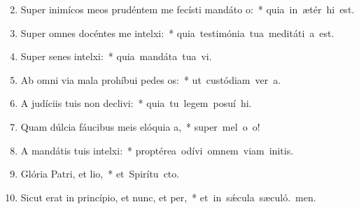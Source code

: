 \begin{flushleft}
\begin{enumerate}[leftmargin=*]
\setcounter{enumi}{1}

\item Super inimícos meos prudéntem me fecísti mandáto o:~* \mbox{quia in ætér hi est.}
\item Super omnes docéntes me intelxi:~* \mbox{quia testimónia tua meditáti a est.}
\item Super senes intelxi:~* \mbox{quia mandáta tua vi.}
\item Ab omni via mala prohíbui pedes os:~* \mbox{ut custódiam ver a.}
\item A judíciis tuis non declivi:~* \mbox{quia tu legem posuí hi.}
\item Quam dúlcia fáucibus meis elóquia a,~* \mbox{super mel o o!}
\item A mandátis tuis intelxi:~* \mbox{proptérea odívi omnem viam initis.}
\item Glória Patri, et lio,~* \mbox{et Spirítu cto.}
\item Sicut erat in princípio, et nunc, et per,~* \mbox{et in s\'{\ae}cula sæculó. men.}

\end{enumerate}
\end{flushleft}


